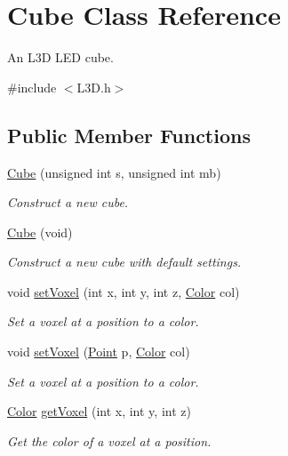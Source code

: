 \hypertarget{classCube}{}\section{Cube Class Reference}
\label{classCube}


An L3D L\+ED cube.  




{\ttfamily \#include $<$L3\+D.\+h$>$}

\subsection*{Public Member Functions}
\begin{DoxyCompactItemize}
\item 
\mbox{\hyperlink{classCube_a3ac832a5fc2640677703e9e47d5f4e3a}{Cube}} (unsigned int s, unsigned int mb)
\begin{DoxyCompactList}\small\item\em Construct a new cube. \end{DoxyCompactList}\item 
\mbox{\hyperlink{classCube_ac51192b04110f845ae10597bc0721716}{Cube}} (void)
\begin{DoxyCompactList}\small\item\em Construct a new cube with default settings. \end{DoxyCompactList}\item 
void \mbox{\hyperlink{classCube_a96c7255f2375201299eb36362be43e94}{set\+Voxel}} (int x, int y, int z, \mbox{\hyperlink{structColor}{Color}} col)
\begin{DoxyCompactList}\small\item\em Set a voxel at a position to a color. \end{DoxyCompactList}\item 
void \mbox{\hyperlink{classCube_a3e03c0b62ec4e3bad49ca108b68934ba}{set\+Voxel}} (\mbox{\hyperlink{structPoint}{Point}} p, \mbox{\hyperlink{structColor}{Color}} col)
\begin{DoxyCompactList}\small\item\em Set a voxel at a position to a color. \end{DoxyCompactList}\item 
\mbox{\hyperlink{structColor}{Color}} \mbox{\hyperlink{classCube_ad8ae2126ecb22403169ae1e577d1d011}{get\+Voxel}} (int x, int y, int z)
\begin{DoxyCompactList}\small\item\em Get the color of a voxel at a position. \end{DoxyCompactList}\item 

\end{DoxyCompactItemize}
